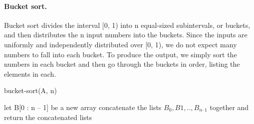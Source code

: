 

\paragraph{Bucket sort.}
Bucket sort divides the interval [0, 1) into n equal-sized subintervals, or buckets, and then distributes the n input numbers into the buckets. Since the inputs are uniformly and independently distributed over [0, 1), we do not expect many numbers to fall into each bucket. To produce the output, we simply sort the numbers in each bucket and then go through the buckets in order, listing the elements in each.

\begin{algbox}{bucket-sort(A, n)}
  \begin{algorithm}[H]
    	let B[0 : n – 1] be a new array
	\For{ $i \leftarrow [1, n]$}{
	    insert $A_{i}$ into list $B_{ \lfloor n A_{i} \rfloor} ]$
       	}
	concatenate the lists $B_{0}, B{1}, .. , B_{n – 1}$ together and\\
	return the concatenated lists
  \end{algorithm}
\end{algbox}



